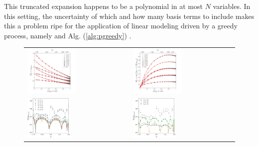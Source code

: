 \documentclass[twocolumn,aps,prd,floatfix,preprintnumbers,a4paper,nofootinbib,
superscriptaddress,10pt]{revtex4-1}
\begin{document}
%
%
\par This truncated expansion happens to be a polynomial in at most $N$ variables.
%
In this setting, the uncertainty of which and how many basis terms to include makes this a problem ripe for the application of linear modeling driven by a greedy process, namely  and Alg. (\ref{alg:pgreedy}) .
%
%
\begin{figure}[htb]
  \begin{tabular}{ll}
    {\includegraphics[width=0.49\textwidth]{fits_w.pdf}} & {\includegraphics[width=0.49\textwidth]{fits_tau.pdf}}
    \\
    \hspace{0.35cm}\includegraphics[width=0.43\textwidth]{res_cw_0.pdf} & \hspace{0.3cm}\includegraphics[width=0.43\textwidth]{res_cw_1.pdf}

\end{tabular}
\end{figure}
\end{document}
